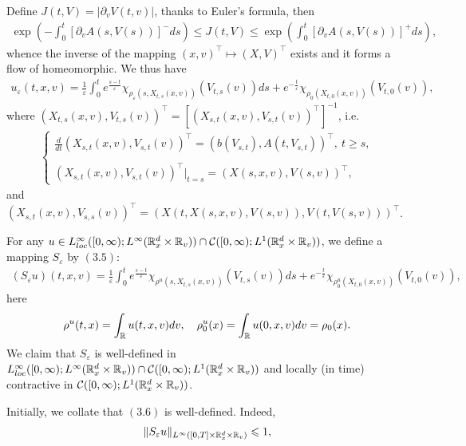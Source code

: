 \documentclass[11pt]{article}
\def\geq{\geqslant}\def\leq{\leqslant}
\begin{document}
 \vskip1mm\par
Define $J(t,V)=|\partial_vV(t,v)|$, thanks to Euler's formula, then
\begin{eqnarray}\label{3.4}
\exp(-\int^t_0[\partial_vA(s,V(s))]^-ds)\leq J(t,V)\leq
\exp(\int^t_0[\partial_vA(s,V(s))]^+ds),
\end{eqnarray}
whence the inverse of the mapping $(x,v)^\top \mapsto
 (X,V)^\top$ exists and it forms a flow of homeomorphic. We thus have
\begin{eqnarray}\label{3.5}
u_\varepsilon(t,x,v)=\frac{1}{\varepsilon}\int^t_0e^{\frac{s-t}
{\varepsilon}}
\chi_{\rho_\varepsilon(s,X_{t,s}(x,v))}(V_{t,s}(v))ds+
e^{-\frac{t}{\varepsilon}}\chi_{\rho_0(X_{t,0}(x,v))}(V_{t,0}(v)),
\end{eqnarray}
where
$(X_{t,s}(x,v),V_{t,s}(v))^\top=[(X_{s,t}(x,v),V_{s,t}(v))^\top]^{-1}$,
i.e.
\begin{eqnarray*}
\left\{
  \begin{array}{ll}
 \frac{d}{dt}(X_{s,t}(x,v),V_{s,t}(v))^\top=(b(V_{s,t}),
A(t,V_{s,t}))^\top, \ t\geq s, \\ \\ (X_{s,t}(x,v),
V_{s,t}(v))^\top|_{t=s}=(X(s,x,v),V(s,v))^\top,
  \end{array}
\right.
\end{eqnarray*}
and
$(X_{s,t}(x,v),V_{s,s}(v))^\top=(X(t,X(s,x,v),V(s,v)),V(t,V(s,v)))^\top$.
 \vskip2mm\par
For any $u\in
L^\infty_{loc}([0,\infty);L^\infty({\mathbb R}^d_x\times{\mathbb R}_v))\cap
{\mathcal C}([0,\infty);L^1({\mathbb R}^d_x\times{\mathbb R}_v))$, we define a mapping
$S_\varepsilon$ by $(3.5)$:
\begin{eqnarray}\label{3.6}
(S_\varepsilon u)(t,x,v)=\frac{1}{\varepsilon}\int^t_0e^{\frac{s-t}
{\varepsilon}} \chi_{\rho^u(s,X_{t,s}(x,v))}(V_{t,s}(v))ds+
e^{-\frac{t}{\varepsilon}}\chi_{\rho_0^u(X_{t,0}(x,v))}(V_{t,0}(v)),
\end{eqnarray}
here
$$
\rho^u(t,x)=\int_{\mR}u(t,x,v)dv, \ \ \ \rho_0^u(x)=\int_{{\mathbb
R}}u(0,x,v)dv=\rho_0(x).
$$
We claim that $S_\varepsilon$ is well-defined in
$L^\infty_{loc}([0,\infty);L^\infty({\mathbb R}^d_x\times{\mathbb R}_v))\cap
{\mathcal C}([0,\infty);L^1({\mathbb R}^d_x\times{\mathbb R}_v))$ and locally (in time)
contractive in ${\mathcal C}([0,\infty);L^1({\mathbb R}^d_x\times{\mathbb R}_v))$.
  \vskip1mm\par
Initially, we collate that $(3.6)$ is well-defined. Indeed,
\begin{eqnarray}\label{3.7}
\|S_\varepsilon u\|_{L^\infty([0,T]\times \mR^d_x\times\mR_v)}\leq
1,
\end{eqnarray}
\end{document}
